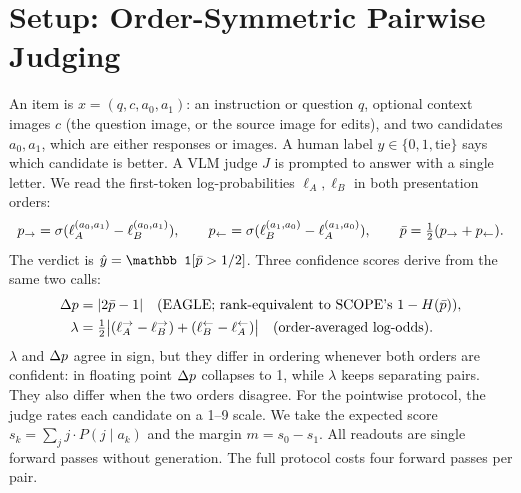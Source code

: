 \section{Setup: Order-Symmetric Pairwise Judging}\label{sec:setup}

An item is $x=(q, c, a_0, a_1)$: an instruction or question $q$, optional context images $c$ (the question image, or the source image for edits), and two candidates $a_0,a_1$, which are either responses or images.
A human label $y\in\{0,1,\text{tie}\}$ says which candidate is better.
A VLM judge $J$ is prompted to answer with a single letter. We read the first-token log-probabilities $\ell_A,\ell_B$ in both presentation orders:
\begin{equation}
  p_{\to}=\sigma(\ell_A^{(a_0,a_1)}-\ell_B^{(a_0,a_1)}),\qquad
  p_{\leftarrow}=\sigma(\ell_B^{(a_1,a_0)}-\ell_A^{(a_1,a_0)}),\qquad
  \bar p=\tfrac12(p_{\to}+p_{\leftarrow}).
\end{equation}
The verdict is $\hat y=\mathbb 1[\pbar>1/2]$. Three confidence scores derive from the same two calls:
\begin{align}
  \Delta p &= |2\bar p-1| \quad\text{(EAGLE; rank-equivalent to SCOPE's } 1-H(\bar p)\text{)},\\
  \lambda &= \tfrac12\big|(\ell_A^{\to}-\ell_B^{\to})+(\ell_B^{\leftarrow}-\ell_A^{\leftarrow})\big| \quad\text{(order-averaged log-odds)}.
\end{align}
$\lambda$ and $\Delta p$ agree in sign, but they differ in ordering whenever both orders are confident: in floating point $\Delta p$ collapses to 1, while $\lambda$ keeps separating pairs. They also differ when the two orders disagree.
For the pointwise protocol, the judge rates each candidate on a 1--9 scale. We take the expected score $s_k=\sum_j j\cdot P(j\mid a_k)$ and the margin $m=s_0-s_1$.
All readouts are single forward passes without generation. The full protocol costs four forward passes per pair.
